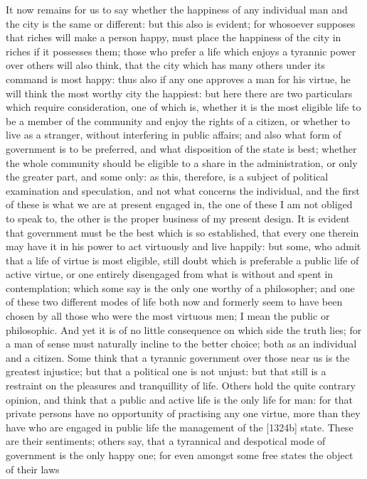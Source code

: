 It now remains for us to say whether the happiness of any individual man
and the city is the same or different: but this also is evident; for
whosoever supposes that riches will make a person happy, must place the
happiness of the city in riches if it possesses them; those who prefer a
life which enjoys a tyrannic power over others will also think, that the
city which has many others under its command is most happy: thus also if
any one approves a man for his virtue, he will think the most worthy city
the happiest: but here there are two particulars which require
consideration, one of which is, whether it is the most eligible life to be
a member of the community and enjoy the rights of a citizen, or whether to
live as a stranger, without interfering in public affairs; and also what
form of government is to be preferred, and what disposition of the state
is best; whether the whole community should be eligible to a share in the
administration, or only the greater part, and some only: as this,
therefore, is a subject of political examination and speculation, and not
what concerns the individual, and the first of these is what we are at
present engaged in, the one of these I am not obliged to speak to, the
other is the proper business of my present design. It is evident that
government must be the best which is so established, that every one
therein may have it in his power to act virtuously and live happily: but
some, who admit that a life of virtue is most eligible, still doubt which
is preferable a public life of active virtue, or one entirely disengaged
from what is without and spent in contemplation; which some say is the
only one worthy of a philosopher; and one of these two different modes of
life both now and formerly seem to have been chosen by all those who were
the most virtuous men; I mean the public or philosophic. And yet it is of
no little consequence on which side the truth lies; for a man of sense
must naturally incline to the better choice; both as an individual and a
citizen. Some think that a tyrannic government over those near us is the
greatest injustice; but that a political one is not unjust: but that still
is a restraint on the pleasures and tranquillity of life. Others hold the
quite contrary opinion, and think that a public and active life is the
only life for man: for that private persons have no opportunity of
practising any one virtue, more than they have who are engaged in public
life the management of the [1324b] state. These are their sentiments;
others say, that a tyrannical and despotical mode of government is the
only happy one; for even amongst some free states the object of their laws
